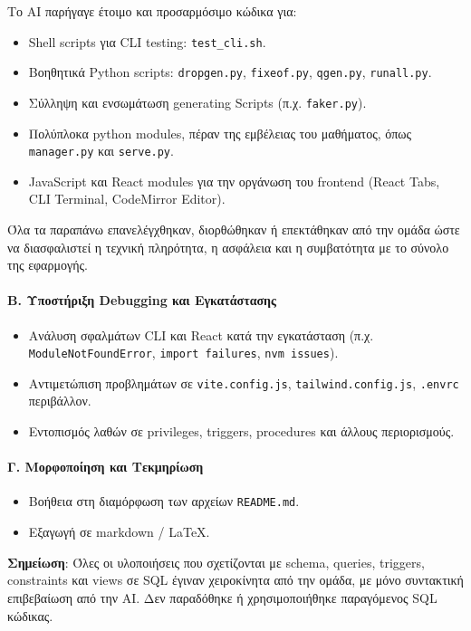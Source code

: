 \documentclass[13pt]{extarticle}
\begin{document}
Το AI παρήγαγε έτοιμο και προσαρμόσιμο κώδικα για:
\begin{itemize}
    \item Shell scripts για CLI testing: \texttt{test\_cli.sh}.
    \item Bοηθητικά Python scripts: \texttt{dropgen.py}, \texttt{fixeof.py}, \texttt{qgen.py}, \texttt{runall.py}.
    \item Σύλληψη και ενσωμάτωση generating Scripts (π.χ. \texttt{faker.py}).
    \item Πολύπλοκα python modules, πέραν της εμβέλειας του μαθήματος, όπως \texttt{manager.py} και \texttt{serve.py}.
    \item JavaScript και React modules για την οργάνωση του frontend (React Tabs, CLI Terminal, CodeMirror Editor).
\end{itemize}
Όλα τα παραπάνω επανελέγχθηκαν, διορθώθηκαν ή επεκτάθηκαν από την ομάδα ώστε να διασφαλιστεί η τεχνική πληρότητα, η ασφάλεια και η συμβατότητα με το σύνολο της εφαρμογής.

\paragraph{Β. Υποστήριξη Debugging και Εγκατάστασης}
\begin{itemize}
    \item Ανάλυση σφαλμάτων CLI και React κατά την εγκατάσταση (π.χ. \texttt{ModuleNotFoundError}, \texttt{import failures}, \texttt{nvm issues}).
    \item Αντιμετώπιση προβλημάτων σε \texttt{vite.config.js}, \texttt{tailwind.config.js}, \texttt{.envrc} περιβάλλον.
    \item Εντοπισμός λαθών σε privileges, triggers, procedures και άλλους περιορισμούς.
\end{itemize}

\paragraph{Γ. Μορφοποίηση και Τεκμηρίωση}
\begin{itemize}
    \item Βοήθεια στη διαμόρφωση των αρχείων \texttt{README.md}.
    \item Εξαγωγή σε markdown / LaTeX.
\end{itemize}

\textbf{Σημείωση}: Όλες οι υλοποιήσεις που σχετίζονται με schema, queries, triggers, constraints και views σε SQL έγιναν χειροκίνητα από την ομάδα, με μόνο συντακτική επιβεβαίωση από την AI. Δεν παραδόθηκε ή χρησιμοποιήθηκε παραγόμενος SQL κώδικας.
\end{document}
